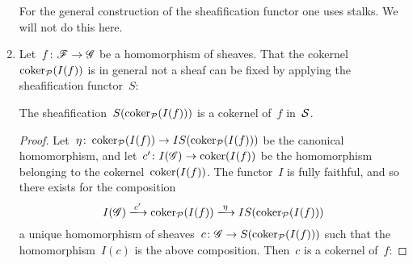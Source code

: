 \begin{example}
\begin{enumerate}
      For the general construction of the sheafification functor one uses stalks.
      We will not do this here.
      
    \item
      Let~$f \colon \mathscr{F} \to \mathscr{G}$ be a homomorphism of sheaves.
      That the cokernel~$\operatorname{coker}_{\mathcal{P}}(I(f))$ is in general not a sheaf can be fixed by applying the sheafification functor~$S$:
      
      \begin{claimnonum}
        The sheafification~$S(\operatorname{coker}_{\mathcal{P}}(I(f)))$ is a cokernel of~$f$ in~$\mathcal{S}$.
      \end{claimnonum}
      
      \begin{proof}
        Let~$\eta \colon \operatorname{coker}_{\mathcal{P}}(I(f)) \to IS( \operatorname{coker}_{\mathcal{P}}(I(f)) )$ be the canonical homomorphism, and let~$c' \colon I(\mathscr{G}) \to \operatorname{coker}(I(f))$ be the homomorphism belonging to the cokernel~$\operatorname{coker}(I(f))$.
        The functor~$I$ is fully faithful, and so there exists for the composition
        \[
                          I(\Gs)
          \xlongto{c'}    \coker_{\Pcat}(I(f))
          \xlongto{\eta}  IS(\coker_{\Pcat}(I(f)))
        \]
        a unique homomorphism of sheaves~$c \colon \mathscr{G} \to S(\operatorname{coker}_{\mathcal{P}}(I(f)))$ such that the homomorphism~$I(c)$ is the above composition.
        Then~$c$ is a cokernel of~$f$:
        

\end{proof}
\end{enumerate}
\end{example}
